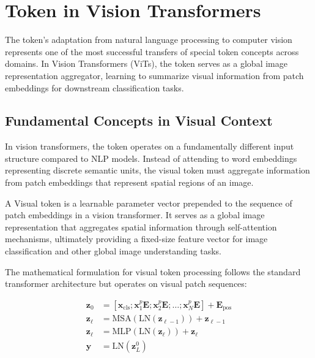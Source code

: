 
\section{\cls{} Token in Vision Transformers}

The \cls{} token's adaptation from natural language processing to computer vision represents one of the most successful transfers of special token concepts across domains. In Vision Transformers (ViTs), the \cls{} token serves as a global image representation aggregator, learning to summarize visual information from patch embeddings for downstream classification tasks.

\subsection{Fundamental Concepts in Visual Context}

In vision transformers, the \cls{} token operates on a fundamentally different input structure compared to NLP models. Instead of attending to word embeddings representing discrete semantic units, the visual \cls{} token must aggregate information from patch embeddings that represent spatial regions of an image.

\begin{definition}
A Visual \cls{} token is a learnable parameter vector prepended to the sequence of patch embeddings in a vision transformer. It serves as a global image representation that aggregates spatial information through self-attention mechanisms, ultimately providing a fixed-size feature vector for image classification and other global image understanding tasks.
\end{definition}

The mathematical formulation for visual \cls{} token processing follows the standard transformer architecture but operates on visual patch sequences:

\begin{align}
\mathbf{z}_0 &= [\mathbf{x}_{\text{cls}}; \mathbf{x}_1^p\mathbf{E}; \mathbf{x}_2^p\mathbf{E}; \ldots; \mathbf{x}_N^p\mathbf{E}] + \mathbf{E}_{\text{pos}} \\
\mathbf{z}_\ell &= \text{MSA}(\text{LN}(\mathbf{z}_{\ell-1})) + \mathbf{z}_{\ell-1} \\
\mathbf{z}_\ell &= \text{MLP}(\text{LN}(\mathbf{z}_\ell)) + \mathbf{z}_\ell \\
\mathbf{y} &= \text{LN}(\mathbf{z}_L^0)
\end{align}

